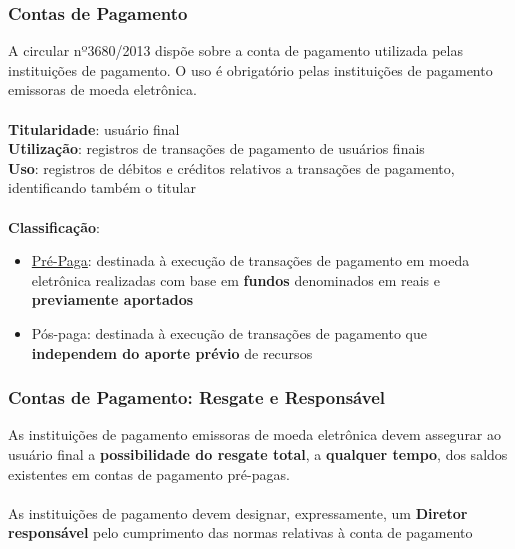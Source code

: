 \documentclass[10pt]{beamer}
\begin{document}
\begin{frame} 
\frametitle{Contas de Pagamento}

A circular nº3680/2013 dispõe sobre a conta de pagamento utilizada pelas instituições de pagamento. O uso é obrigatório pelas instituições de pagamento emissoras de moeda eletrônica.
\\~\\
\textbf{Titularidade}: usuário final
\\
\textbf{Utilização}: registros de transações de pagamento de usuários finais
\\
\textbf{Uso}: registros de débitos e créditos relativos a transações de pagamento, identificando também o titular
\\~\\
\textbf{Classificação}:
\begin{itemize}
	\item \underline{Pré-Paga}: destinada à execução de transações de pagamento em moeda eletrônica realizadas com base em \textbf{fundos} denominados em reais e \textbf{previamente aportados}
	\item Pós-paga: destinada à execução de transações de pagamento que \textbf{independem do aporte prévio} de recursos
\end{itemize}

\end{frame}

\begin{frame} 
\frametitle{Contas de Pagamento: Resgate e Responsável}

As instituições de pagamento emissoras de moeda eletrônica devem assegurar ao usuário final a \textbf{possibilidade do resgate total}, a \textbf{qualquer tempo}, dos saldos existentes em contas de pagamento pré-pagas.
\\~\\
As instituições de pagamento devem designar, expressamente, um \textbf{Diretor responsável} pelo cumprimento das normas relativas à conta de pagamento

\end{frame}
\end{document}
